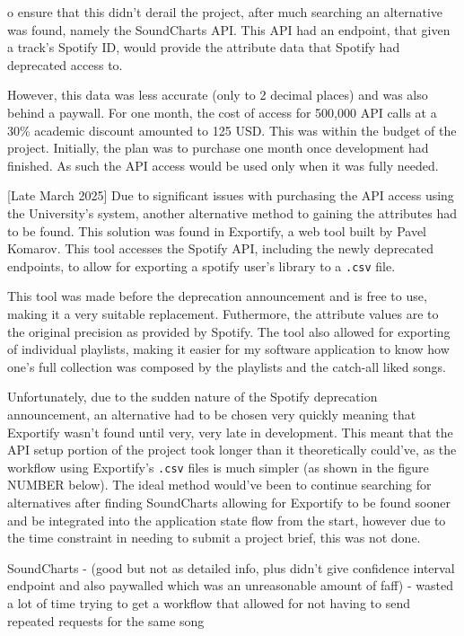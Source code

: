 o ensure that this didn't derail the project, after much searching an alternative was found, namely the SoundCharts API. This API had an endpoint, that given a track's Spotify ID, would provide the attribute data that Spotify had deprecated access to.

However, this data was less accurate (only to 2 decimal places) and was also behind a paywall. For one month, the cost of access for 500,000 API calls at a 30\% academic discount amounted to 125 USD. This was within the budget of the project. Initially, the plan was to purchase one month once development had finished. As such the API access would be used only when it was fully needed.

[Late March 2025] Due to significant issues with purchasing the API access using the University's system, another alternative method to gaining the attributes had to be found. This solution was found in Exportify, a web tool built by Pavel Komarov. This tool accesses the Spotify API, including the newly deprecated endpoints, to allow for exporting a spotify user's library to a \lstinline|.csv| file.

This tool was made before the deprecation announcement and is free to use, making it a very suitable replacement. Futhermore, the attribute values are to the original precision as provided by Spotify. The tool also allowed for exporting of individual playlists, making it easier for my software application to know how one's full collection was composed by the playlists and the catch-all liked songs.

Unfortunately, due to the sudden nature of the Spotify deprecation announcement, an alternative had to be chosen very quickly meaning that Exportify wasn't found until very, very late in development. This meant that the API setup portion of the project took longer than it theoretically could've, as the workflow using Exportify's \lstinline|.csv| files is much simpler (as shown in the figure NUMBER below). The ideal method would've been to continue searching for alternatives after finding SoundCharts allowing for Exportify to be found sooner and be integrated into the application state flow from the start, however due to the time constraint in needing to submit a project brief, this was not done.%

SoundCharts - (good but not as detailed info, plus didn't give confidence interval endpoint and also paywalled which was an unreasonable amount of faff) - wasted a lot of time trying to get a workflow that allowed for not having to send repeated requests for the same song

